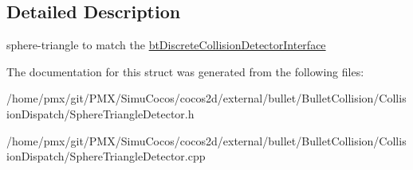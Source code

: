\subsection{Detailed Description}
sphere-\/triangle to match the \hyperlink{structbtDiscreteCollisionDetectorInterface}{bt\+Discrete\+Collision\+Detector\+Interface} 

The documentation for this struct was generated from the following files\+:\begin{DoxyCompactItemize}
\item 
/home/pmx/git/\+P\+M\+X/\+Simu\+Cocos/cocos2d/external/bullet/\+Bullet\+Collision/\+Collision\+Dispatch/Sphere\+Triangle\+Detector.\+h\item 
/home/pmx/git/\+P\+M\+X/\+Simu\+Cocos/cocos2d/external/bullet/\+Bullet\+Collision/\+Collision\+Dispatch/Sphere\+Triangle\+Detector.\+cpp\end{DoxyCompactItemize}
